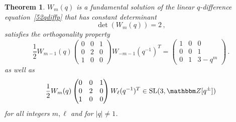 \documentclass[12pt,reqno]{amsart}
\newtheorem{theorem}{Theorem}
\theoremstyle{definition}
\def\BZ{\mathbbm Z}
\def\SL{\mathrm{SL}}
\begin{document}
\begin{theorem}
  \label{thm.520}
  $W_m(q)$ is a fundamental solution of the linear $q$-difference
  equation~\eqref{52qdiffp} that has constant determinant
\begin{equation}
  \label{det52}
  \det(W_m(q))=2 \,,
\end{equation}
satisfies
the orthogonality property 
\begin{equation}
  \label{WWT52b}
  \frac{1}{2} W_{m-1}(q)
  \begin{pmatrix} 0 & 0 & 1 \\ 0&2&0\\ 1 & 0 &0  \end{pmatrix}
  W_{-m-1}(q^{-1})^T =
  \begin{pmatrix} 1 & 0 & 0 \\ 0 & 0 & 1\\0 & 1 & 3-q^{m} \end{pmatrix} \,.
\end{equation}
as well as 
\begin{equation}
  \label{WWT52}
  \frac{1}{2} W_m(q)
  \begin{pmatrix} 0 & 0 & 1 \\ 0&2&0\\ 1 & 0 &0 \end{pmatrix}
  W_{\ell}(q^{-1})^T \in \SL(3,\BZ[q^\pm]) 
\end{equation}
for all integers $m, \ell$ and for $|q| \neq 1$.
\end{theorem}
\end{document}
